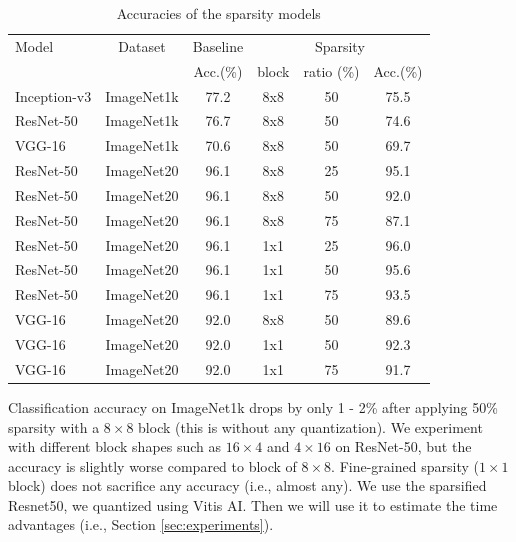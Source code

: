 \documentclass[conference]{IEEEtran}
\begin{document}
\begin{table}[ht]
\caption{Accuracies of the sparsity models}
\label{tab_acc}
\begin{center} 
\scalebox{0.9}
{
\begin{tabular}{|l|c|c|c|c|c|}
\hline
\rule[-1ex]{0pt}{3.5ex}  Model & Dataset & Baseline  & \multicolumn{3}{c|}{Sparsity}\\
\rule[-1ex]{0pt}{3.5ex}  {} & {} & Acc.(\%) & block & ratio (\%) & Acc.(\%)    \\\hline\hline
\rule[-1ex]{0pt}{3.5ex}  Inception-v3 & ImageNet1k & 77.2 & 8x8 & 50 & 75.5  \\\hline
\rule[-1ex]{0pt}{3.5ex}  ResNet-50 & ImageNet1k & 76.7 & 8x8 & 50 & 74.6  \\\hline
\rule[-1ex]{0pt}{3.5ex}  VGG-16    & ImageNet1k & 70.6 & 8x8 & 50 & 69.7  \\\hline \hline
\rule[-1ex]{0pt}{3.5ex}  ResNet-50 & ImageNet20 & 96.1 & 8x8 & 25 & 95.1  \\\hline
\rule[-1ex]{0pt}{3.5ex}  ResNet-50 & ImageNet20 & 96.1 & 8x8 & 50 & 92.0  \\\hline
\rule[-1ex]{0pt}{3.5ex}  ResNet-50 & ImageNet20 & 96.1 & 8x8 & 75 & 87.1  \\\hline
\rule[-1ex]{0pt}{3.5ex}  ResNet-50 & ImageNet20 & 96.1 & 1x1 & 25 & 96.0  \\\hline
\rule[-1ex]{0pt}{3.5ex}  ResNet-50 & ImageNet20 & 96.1 & 1x1 & 50 & 95.6  \\\hline
\rule[-1ex]{0pt}{3.5ex}  ResNet-50 & ImageNet20 & 96.1 & 1x1 & 75 & 93.5  \\\hline
\rule[-1ex]{0pt}{3.5ex}  VGG-16    & ImageNet20 & 92.0 & 8x8 & 50 & 89.6  \\\hline
\rule[-1ex]{0pt}{3.5ex}  VGG-16    & ImageNet20 & 92.0 & 1x1 & 50 & 92.3  \\\hline
\rule[-1ex]{0pt}{3.5ex}  VGG-16    & ImageNet20 & 92.0 & 1x1 & 75 & 91.7  \\\hline
\end{tabular}\vspace{-20pt}
}
\end{center}
\end{table}

Classification accuracy on ImageNet1k drops by only 1 - 2\% after
applying 50\% sparsity with a $8\times 8$ block (this is without any
quantization). We experiment with different block shapes such as
$16\times 4$ and $4\times 16$ on ResNet-50, but the accuracy is
slightly worse compared to block of $8\times 8$. Fine-grained sparsity
($1\times 1$ block) does not sacrifice any accuracy (i.e., almost
any).  We use the sparsified Resnet50, we quantized using Vitis AI.
Then we will use it to estimate the time advantages (i.e., Section
\ref{sec:experiments}).
\end{document}
